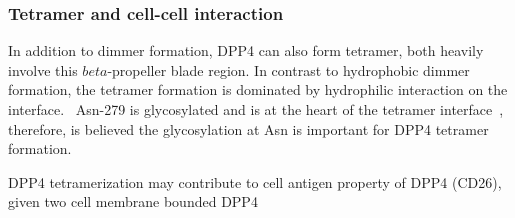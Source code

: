 \subsubsection{Tetramer and cell-cell interaction}

In addition to dimmer formation, DPP4 can also form tetramer, both heavily involve this $beta$-propeller blade region. In contrast to hydrophobic dimmer formation, the tetramer formation is dominated by hydrophilic interaction on the interface.~\cite{Engel_2003} Asn-279 is glycosylated and is at the heart of the tetramer interface~\cite{Engel_2003}, therefore, is believed the glycosylation at Asn is important for DPP4 tetramer formation. 
\par 
DPP4 tetramerization may contribute to cell antigen property of DPP4 (CD26), given two cell membrane bounded DPP4 